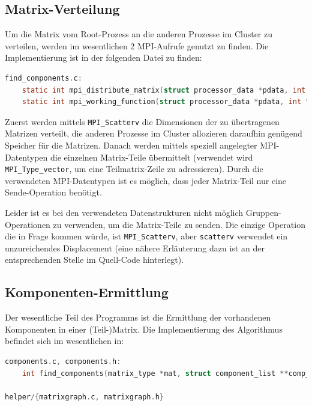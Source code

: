 \subsection{Matrix-Verteilung}

Um die Matrix vom Root-Prozess an die anderen Prozesse im Cluster zu verteilen, werden im wesentlichen 2 MPI-Aufrufe genutzt zu finden. Die Implementierung ist in der folgenden Datei zu finden:

\begin{lstlisting}[language=C, aboveskip=\baselineskip, basicstyle=\footnotesize\ttfamily, lineskip=0pt]
find_components.c:
	static int mpi_distribute_matrix(struct processor_data *pdata, int *dims, matrix_type *input_matrix)
	static int mpi_working_function(struct processor_data *pdata, int *dims)
\end{lstlisting}

Zuerst werden mittels \verb+MPI_Scatterv+ die Dimensionen der zu übertragenen Matrizen verteilt, die anderen Prozesse im Cluster allozieren daraufhin genügend Speicher für die Matrizen. Danach werden mittels speziell angelegter MPI-Datentypen die einzelnen Matrix-Teile übermittelt (verwendet wird \verb+MPI_Type_vector+, um eine Teilmatrix-Zeile zu adressieren). Durch die verwendeten MPI-Datentypen ist es möglich, dass jeder Matrix-Teil nur eine Sende-Operation benötigt.

Leider ist es bei den verwendeten Datenstrukturen nicht möglich Gruppen-Operationen zu verwenden, um die Matrix-Teile zu senden. Die einzige Operation die in Frage kommen würde, ist \verb+MPI_Scatterv+, aber \verb+scatterv+ verwendet ein unzureichendes Displacement (eine nähere Erläuterung dazu ist an der entsprechenden Stelle im Quell-Code hinterlegt).

\subsection{Komponenten-Ermittlung} \label{algorithm:find_components}

Der wesentliche Teil des Programms ist die Ermittlung der vorhandenen Komponenten in einer (Teil-)Matrix. Die Implementierung des Algorithmus befindet sich im wesentlichen in:

\begin{lstlisting}[language=C, aboveskip=\baselineskip, basicstyle=\footnotesize\ttfamily, lineskip=0pt]
components.c, components.h:
	int find_components(matrix_type *mat, struct component_list **comp_list, vector_type **borders)

helper/{matrixgraph.c, matrixgraph.h}
\end{lstlisting}


